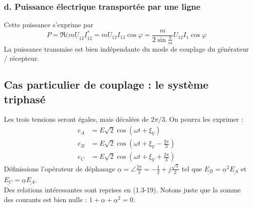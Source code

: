 		
		\subsubsection{d. Puissance électrique transportée par une ligne}
		Cette puissance s'exprime par 
		\begin{equation}
		P = \Re(m\underline{U}_{12}\underline{I}_{12}^* = mU_{12}I_{12}\cos
		\varphi = \frac{m}{2\sin\frac{\pi}{m}}U_{12}I_1\cos\varphi
		\end{equation}
		La puissance transmise est bien indépendante du mode de couplage du 
		générateur / récepteur.
		
	\subsection{Cas particulier de couplage : le système triphasé}
	Les trois tensions seront égales, mais décalées de $2\pi/3$. On pourra 
	les exprimer :
	\begin{equation}
	\begin{array}{ll}
	e_A &= E\sqrt{2}\cos(\omega t +\xi_V)\\
	e_B &= E\sqrt{2}\cos(\omega t +\xi_V - \frac{2\pi}{3})\\
	e_C &= E\sqrt{2}\cos(\omega t +\xi_V + \frac{2\pi}{3})		
	\end{array}
	\end{equation}
	Définissions l'opérateur de déphasage $\underline{\alpha} = \angle \frac{2
	\pi}{3} = -\frac{1}{2}+j\frac{\sqrt{3}}{2}$ tel que $\underline{E_B} = 
	\underline{\alpha}^2\underline{E_A}$ et $\underline{E_C} = \underline{\alpha}
	\underline{E_A}$.\\
	Des relations intéressantes sont reprises en (1.3-19). Notons juste que 
	la somme des courants est bien nulle : $1+\underline{\alpha}+\underline{
	\alpha}^2 = 0$.
		

